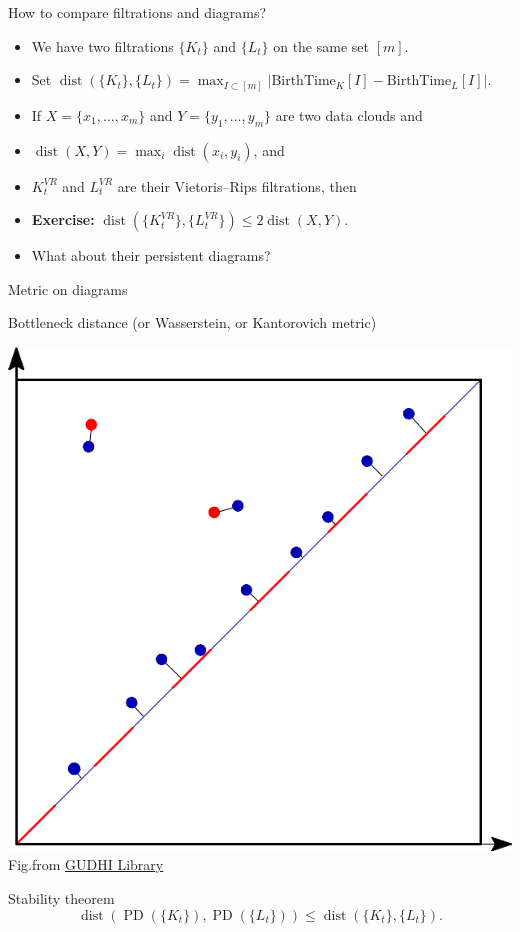 \documentclass[10pt,xcolor={usenames}]{beamer}
\DeclareMathOperator{\PD}{PD}
\DeclareMathOperator{\dist}{dist}
\begin{document}
\begin{frame}{How to compare filtrations and diagrams?}

\begin{itemize}
  \item We have two filtrations $\{K_t\}$ and $\{L_t\}$ on the same set $[m]$.
  \item Set $\dist(\{K_t\},\{L_t\})=\max_{I\subset [m]}|\mbox{BirthTime}_K[I]-\mbox{BirthTime}_L[I]|$.\pause
  \item If $X=\{x_1,\ldots,x_m\}$ and $Y=\{y_1,\ldots,y_m\}$ are two data clouds and
  \item $\dist(X,Y)=\max_i\dist(x_i,y_i)$, and
  \item $K^{VR}_t$ and $L^{VR}_t$ are their Vietoris--Rips filtrations\pause, then
  \item \textbf{Exercise:} $\dist(\{K^{VR}_t\},\{L^{VR}_t\})\leqslant 2\dist(X,Y)$.\pause
  \item What about their persistent diagrams?
\end{itemize}

\end{frame}

\begin{frame}{Metric on diagrams}

Bottleneck distance (or Wasserstein, or Kantorovich metric)

\begin{center}
\includegraphics[scale = 0.4]{pictures/bottleneck.png}\break
Fig.from \href{https://gudhi.inria.fr/doc/latest/group\_\_bottleneck\_\_distance.html}{GUDHI Library}
\end{center}
\pause
\begin{block}{Stability theorem}
\[
\dist(\PD(\{K_t\}),\PD(\{L_t\}))\leqslant \dist(\{K_t\},\{L_t\}).
\]
\end{block}

\end{frame}
\end{document}
